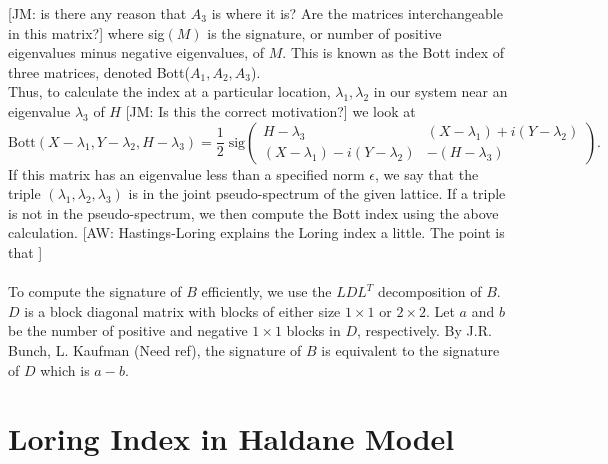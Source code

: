 \documentclass[a4paper]{article}
\newcommand{\aw}[1]{{\color{blue} [AW: #1]}}
\newcommand{\jm}[1]{{\color{red} [JM: #1]}}
\begin{document}
\jm{is there any reason that $A_3$ is where it is? Are the matrices interchangeable in this matrix?}
where sig$(M)$ is the signature, or number of positive eigenvalues minus negative eigenvalues, of $M$.
This is known as the Bott index of three matrices, denoted Bott($A_1,A_2,A_3$).\\
Thus, to calculate the index at a particular location, $\lambda_1,\lambda_2$ in our system near an eigenvalue $\lambda_3$ of $H$ \jm{Is this the correct motivation?} we look at
$$\text{Bott}(X-\lambda_1,Y - \lambda_2, H - \lambda_3) = \frac{1}{2}\; \text{sig}\begin{pmatrix}
H - \lambda_3 & (X - \lambda_1) + i(Y - \lambda_2)\\
(X - \lambda_1) - i(Y - \lambda_2) & - (H - \lambda_3)
\end{pmatrix}.$$
If this matrix has an eigenvalue less than a specified norm $\epsilon$, we say that the triple $(\lambda_1,\lambda_2,\lambda_3)$ is in the joint pseudo-spectrum of the given lattice.
If a triple is not in the pseudo-spectrum, we then compute the Bott index using the above calculation. \aw{Hastings-Loring explains the Loring index a little. The point is that } \\\\
To compute the signature of $B$ efficiently, we use the $LDL^T$ decomposition of $B$. $D$ is a block diagonal matrix with blocks of either size $1 \times 1$ or $2 \times 2$. Let $a$ and $b$ be the number of positive and negative $1 \times 1$ blocks in $D$, respectively. By J.R. Bunch, L. Kaufman (Need ref), the signature of $B$ is equivalent to the signature of $D$ which is $a - b$.
\section{Loring Index in Haldane Model}
\end{document}
